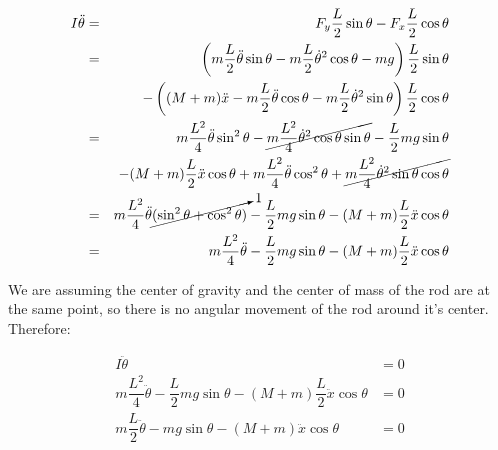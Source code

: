 \documentclass{notes}
\begin{document}
 \begin{eqnarray*}
   I\ddot{\theta} & = & F_y\dfrac{L}{2}\sin\theta - F_x\dfrac{L}{2}\cos\theta \\
     & = & \left( m\dfrac{L}{2}\ddot{\theta}\sin\theta - m\dfrac{L}{2}\dot{\theta}^2\cos\theta 
            - mg\right) \dfrac{L}{2}\sin\theta \\
     &   & -\left( (M+m)\ddot{x} - m\dfrac{L}{2}\ddot{\theta}\cos\theta - 
             m\dfrac{L}{2}\dot{\theta}^2\sin\theta \right) \dfrac{L}{2}\cos\theta\\
     & = & m\dfrac{L^2}{4}\ddot{\theta}\sin^2\theta 
           - \cancel{m\dfrac{L^2}{4}\dot{\theta}^2\cos\theta\sin\theta} - \dfrac{L}{2}mg\sin\theta\\
     &   & - (M+m) \dfrac{L}{2} \ddot{x}\cos\theta + m\dfrac{L^2}{4}\ddot{\theta}\cos^2\theta + 
             \cancel{m\dfrac{L^2}{4}\dot{\theta}^2\sin\theta\cos\theta} \\
     & = & m\dfrac{L^2}{4}\ddot{\theta}\cancelto{1}{(\sin^2\theta + \cos^2\theta)}
           - \dfrac{L}{2}mg\sin\theta - (M+m) \dfrac{L}{2}\ddot{x}\cos\theta \\
     & = & m \dfrac{L^2}{4}\ddot{\theta} - \dfrac{L}{2}mg\sin\theta 
           - (M+m) \dfrac{L}{2} \ddot{x}\cos\theta
 \end{eqnarray*}

We are assuming the center of gravity and the center of mass of the rod are at the same point, so
there is no angular movement of the rod around it's center. Therefore:

\begin{align}
  I\ddot{\theta} & = 0 \nonumber\\
  m \dfrac{L^2}{4}\ddot{\theta} - \dfrac{L}{2}mg\sin\theta 
      - (M+m) \dfrac{L}{2} \ddot{x}\cos\theta  & = 0 \nonumber\\
  m\dfrac{L}{2}\ddot{\theta} - mg\sin\theta - (M+m)\ddot{x}\cos\theta & = 0 \nonumber
\end{align}
\end{document}
